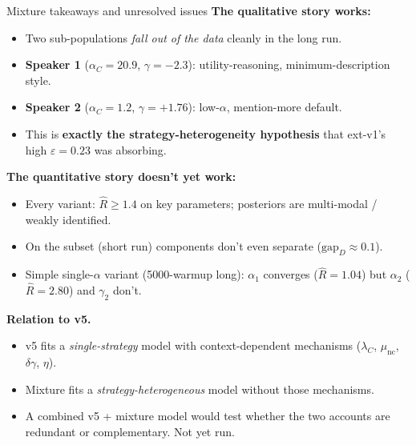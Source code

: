 \documentclass[10pt,aspectratio=169]{beamer}
\newcommand{\main}[1]{\textcolor{CSP-main-dark}{\textbf{#1}}}
\newcommand{\emp}[1]{\textcolor{CSP-emphasis}{\textbf{#1}}}
\begin{document}
\begin{frame}{Mixture takeaways and unresolved issues}
\small
\main{The qualitative story works:}
\begin{itemize}\itemsep0.15em
  \item Two sub-populations \emph{fall out of the data} cleanly in the long run.
  \item \main{Speaker 1} ($\alpha_C = 20.9$, $\gamma = -2.3$): utility-reasoning, minimum-description style.
  \item \main{Speaker 2} ($\alpha_C = 1.2$, $\gamma = +1.76$): low-$\alpha$, mention-more default.
  \item This is \emp{exactly the strategy-heterogeneity hypothesis} that ext-v1's high $\varepsilon = 0.23$ was absorbing.
\end{itemize}

\vspace{0.6em}
\main{The quantitative story doesn't yet work:}
\begin{itemize}\itemsep0.15em
  \item Every variant: $\hat R \geq 1.4$ on key parameters; posteriors are multi-modal / weakly identified.
  \item On the subset (short run) components don't even separate ($\mathrm{gap}_D \approx 0.1$).
  \item Simple single-$\alpha$ variant (5000-warmup long): $\alpha_1$ converges ($\hat R = 1.04$) but $\alpha_2$ ($\hat R = 2.80$) and $\gamma_2$ don't.
\end{itemize}

\vspace{0.6em}
\main{Relation to v5.}
\begin{itemize}\itemsep0.15em
  \item v5 fits a \emph{single-strategy} model with context-dependent mechanisms ($\lambda_C$, $\mu_\mathrm{nc}$, $\delta\gamma$, $\eta$).
  \item Mixture fits a \emph{strategy-heterogeneous} model without those mechanisms.
  \item A combined v5 + mixture model would test whether the two accounts are redundant or complementary. Not yet run.
\end{itemize}
\end{frame}
\end{document}
